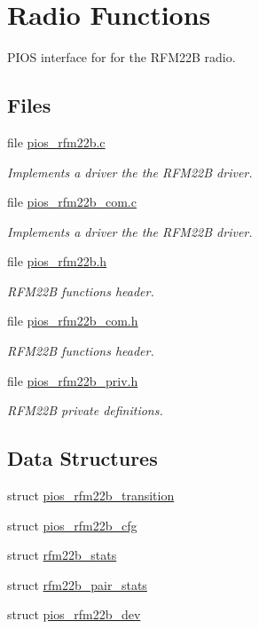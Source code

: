 \hypertarget{group___p_i_o_s___r_f_m22_b}{\section{Radio Functions}
\label{group___p_i_o_s___r_f_m22_b}
}


P\-I\-O\-S interface for for the R\-F\-M22\-B radio.  


\subsection*{Files}
\begin{DoxyCompactItemize}
\item 
file \hyperlink{pios__rfm22b_8c}{pios\-\_\-rfm22b.\-c}
\begin{DoxyCompactList}\small\item\em Implements a driver the the R\-F\-M22\-B driver. \end{DoxyCompactList}\item 
file \hyperlink{pios__rfm22b__com_8c}{pios\-\_\-rfm22b\-\_\-com.\-c}
\begin{DoxyCompactList}\small\item\em Implements a driver the the R\-F\-M22\-B driver. \end{DoxyCompactList}\item 
file \hyperlink{pios__rfm22b_8h}{pios\-\_\-rfm22b.\-h}
\begin{DoxyCompactList}\small\item\em R\-F\-M22\-B functions header. \end{DoxyCompactList}\item 
file \hyperlink{pios__rfm22b__com_8h}{pios\-\_\-rfm22b\-\_\-com.\-h}
\begin{DoxyCompactList}\small\item\em R\-F\-M22\-B functions header. \end{DoxyCompactList}\item 
file \hyperlink{pios__rfm22b__priv_8h}{pios\-\_\-rfm22b\-\_\-priv.\-h}
\begin{DoxyCompactList}\small\item\em R\-F\-M22\-B private definitions. \end{DoxyCompactList}\end{DoxyCompactItemize}
\subsection*{Data Structures}
\begin{DoxyCompactItemize}
\item 
struct \hyperlink{structpios__rfm22b__transition}{pios\-\_\-rfm22b\-\_\-transition}
\item 
struct \hyperlink{structpios__rfm22b__cfg}{pios\-\_\-rfm22b\-\_\-cfg}
\item 
struct \hyperlink{structrfm22b__stats}{rfm22b\-\_\-stats}
\item 
struct \hyperlink{structrfm22b__pair__stats}{rfm22b\-\_\-pair\-\_\-stats}
\item 
struct \hyperlink{structpios__rfm22b__dev}{pios\-\_\-rfm22b\-\_\-dev}
\end{DoxyCompactItemize}
